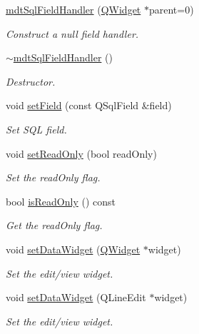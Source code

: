 \begin{DoxyCompactItemize}
\item 
\hyperlink{classmdt_sql_field_handler_a5318b5d67a26163f85ec584fdb1a00bb}{mdt\-Sql\-Field\-Handler} (\hyperlink{class_q_widget}{Q\-Widget} $\ast$parent=0)
\begin{DoxyCompactList}\small\item\em Construct a null field handler. \end{DoxyCompactList}\item 
\hyperlink{classmdt_sql_field_handler_a66e6e5c64033362b70e11745752797e6}{$\sim$mdt\-Sql\-Field\-Handler} ()
\begin{DoxyCompactList}\small\item\em Destructor. \end{DoxyCompactList}\item 
void \hyperlink{classmdt_sql_field_handler_a5c0b3077cf5f2622dd107b892ddde76c}{set\-Field} (const Q\-Sql\-Field \&field)
\begin{DoxyCompactList}\small\item\em Set S\-Q\-L field. \end{DoxyCompactList}\item 
void \hyperlink{classmdt_sql_field_handler_a0fc937dec713baad88f6def5b7088565}{set\-Read\-Only} (bool read\-Only)
\begin{DoxyCompactList}\small\item\em Set the read\-Only flag. \end{DoxyCompactList}\item 
bool \hyperlink{classmdt_sql_field_handler_ae5554c5cab22d0400a206197d66b02c6}{is\-Read\-Only} () const 
\begin{DoxyCompactList}\small\item\em Get the read\-Only flag. \end{DoxyCompactList}\item 
void \hyperlink{classmdt_sql_field_handler_ad337249c9e123d31c53ed199384825d0}{set\-Data\-Widget} (\hyperlink{class_q_widget}{Q\-Widget} $\ast$widget)
\begin{DoxyCompactList}\small\item\em Set the edit/view widget. \end{DoxyCompactList}\item 
void \hyperlink{classmdt_sql_field_handler_ac326e3d22f67b1c6f76bb859e01dc486}{set\-Data\-Widget} (Q\-Line\-Edit $\ast$widget)
\begin{DoxyCompactList}\small\item\em Set the edit/view widget. \end{DoxyCompactList}\item 

\end{DoxyCompactItemize}
